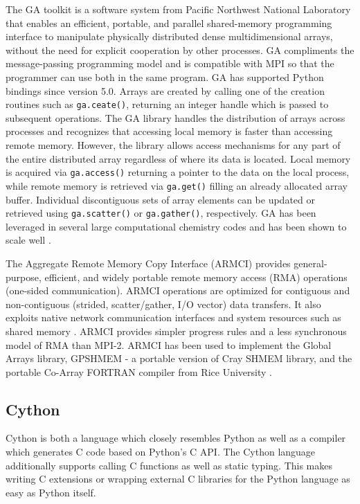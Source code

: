 \documentclass[preprint]{sigplanconf}
\begin{document}
The GA toolkit \cite{Nie06,Nie10,Pnl11} is a software system from Pacific
Northwest National Laboratory that enables an efficient, portable, and
parallel shared-memory programming interface to manipulate physically
distributed dense multidimensional arrays, without the need for explicit
cooperation by other processes. GA compliments the message-passing programming
model and is compatible with MPI so that the programmer can use both in the
same program. GA has supported Python bindings since version 5.0. Arrays are
created by calling one of the creation routines such as \verb=ga.ceate()=,
returning an integer handle which is passed to subsequent operations. The GA
library handles the distribution of arrays across processes and recognizes
that accessing local memory is faster than accessing remote memory. However,
the library allows access mechanisms for any part of the entire distributed
array regardless of where its data is located. Local memory is acquired via
\verb=ga.access()= returning a pointer to the data on the local process, while
remote memory is retrieved via \verb=ga.get()= filling an already allocated
array buffer. Individual discontiguous sets of array elements can be updated
or retrieved using \verb=ga.scatter()= or \verb=ga.gather()=, respectively.
GA has been leveraged in several large computational chemistry codes and has
been shown to scale well \cite{Apr09}.

The Aggregate Remote Memory Copy Interface (ARMCI) provides general-purpose,
efficient, and widely portable remote memory access (RMA) operations
(one-sided communication). ARMCI operations are optimized for contiguous and
non-contiguous (strided, scatter/gather, I/O vector) data transfers. It also
exploits native network communication interfaces and system resources such as
shared memory \cite{Nie00}.  ARMCI provides simpler progress rules and a less
synchronous model of RMA than MPI-2. ARMCI has been used to implement the
Global Arrays library, GPSHMEM - a portable version of Cray SHMEM library, and
the portable Co-Array FORTRAN compiler from Rice University \cite{Dot04}.

\subsection{Cython}

Cython \cite{Beh11} is both a language which closely resembles Python as well
as a compiler which generates C code based on Python's C API. The Cython
language additionally supports calling C functions as well as static typing.
This makes writing C extensions or wrapping external C libraries for the
Python language as easy as Python itself.
\end{document}
